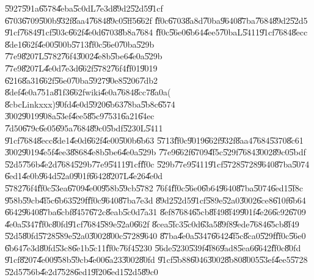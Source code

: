 \begin{case}
\U{5927}\U{591a}\U{6578}\U{4eba}\U{5c0d}L\U{7e3d}\U{89d2}\U{52d5}\U{91cf}%
\U{6703}\U{6709}\U{500b}\U{932f}\U{8aa4}\U{7684}\U{89c0}\U{5ff5}\U{662f}%
\U{ff0c}\U{6703}\U{8a8d}\U{70ba}\U{9640}\U{87ba}\U{7684}\U{89d2}\U{52d5}%
\U{91cf}\U{7684}\U{91cf}\U{503c}\U{662f}\U{4e0d}\U{6703}\U{8b8a}\U{7684}%
\U{ff0c}\U{56e0}\U{6b64}\U{4ee5}\U{70ba}L\U{5411}\U{91cf}\U{7684}\U{8ecc}%
\U{8de1}\U{662f}\U{4e00}\U{500b}\U{5713}\U{ff0c}\U{56e0}\U{70ba}\U{529b}%
\U{77e9}\U{8207}L\U{5782}\U{76f4}\U{3002}\U{4e8b}\U{5be6}\U{4e0a}\U{529b}%
\U{77e9}\U{8207}L\U{4e0d}\U{7e3d}\U{662f}\U{5782}\U{76f4}\U{ff01}\U{9019}%
\U{6216}\U{8a31}\U{662f}\U{56e0}\U{70ba}\U{5927}\U{90e8}\U{5206}\U{7db2}%
\U{8def}\U{4e0a}\U{751a}\U{81f3}\U{662f}wiki\U{4e0a}\U{7684}\U{8cc7}\U{8a0a}(%
\U{8cbc}Linkxxx)\U{90fd}\U{4e0d}\U{5920}\U{6b63}\U{78ba}\U{5b8c}\U{6574}%
\U{3002}\U{9019}\U{908a}\U{53ef}\U{4ee5}\U{85c9}\U{7531}\U{6a21}\U{64ec}%
\U{7d50}\U{679c}\U{6e05}\U{695a}\U{7684}\U{89c0}\U{5bdf}\U{5230}L\U{5411}%
\U{91cf}\U{7684}\U{8ecc}\U{8de1}\U{4e0d}\U{662f}\U{4e00}\U{500b}\U{6b63}%
\U{5713}\U{ff0c}\U{9019}\U{662f}\U{932f}\U{8aa4}\U{7684}\U{5370}\U{8c61}%
\U{3002}\U{9019}\U{4e5f}\U{4ee3}\U{8868}\U{4e8b}\U{5be6}\U{4e0a}\U{529b}%
\U{77e9}\U{662f}\U{6709}\U{4f5c}\U{529f}\U{7684}\U{3002}\U{89c0}\U{5bdf}%
\U{52d5}\U{756b}\U{4e2d}\U{7684}\U{529b}\U{77e9}\U{5411}\U{91cf}\U{ff0c}%
\U{529b}\U{77e9}\U{5411}\U{91cf}\U{5728}\U{5728}\U{9640}\U{87ba}\U{5074}%
\U{6ed1}\U{4e0b}\U{964d}\U{52a0}\U{901f}\U{6642}\U{8207}L\U{4e26}\U{4e0d}%
\U{5782}\U{76f4}\U{ff0c}\U{53ea}\U{6709}\U{4e00}\U{958b}\U{59cb}\U{5782}%
\U{76f4}\U{ff0c}\U{56e0}\U{6b64}\U{9640}\U{87ba}\U{5074}\U{6ed1}\U{5f8c}%
\U{958b}\U{59cb}\U{4f5c}\U{6b63}\U{529f}\U{ff0c}\U{9640}\U{87ba}\U{7e3d}%
\U{89d2}\U{52d5}\U{91cf}\U{589e}\U{52a0}\U{3002}\U{6ce8}\U{610f}\U{6b64}%
\U{6642}\U{9640}\U{87ba}\U{6cbf}\U{8457}\U{672c}\U{8eab}\U{5c0d}\U{7a31}%
\U{8ef8}\U{7684}\U{65cb}\U{8f49}\U{8f49}\U{901f}\U{4e26}\U{6c92}\U{6709}%
\U{4e0a}\U{5347}\U{ff0c}\U{80fd}\U{91cf}\U{7684}\U{589e}\U{52a0}\U{662f}%
\U{8cea}\U{5fc3}\U{5c0d}\U{63a5}\U{89f8}\U{9ede}\U{7684}\U{65cb}\U{8f49}%
\U{52d5}\U{80fd}\U{5728}\U{589e}\U{52a0}\U{3002}\U{800c}\U{5728}\U{9640}%
\U{87ba}\U{4e0a}\U{5347}\U{6642}\U{4f5c}\U{8ca0}\U{529f}\U{ff0c}\U{56e0}%
\U{6b64}\U{7e3d}\U{80fd}\U{53c8}\U{6e1b}\U{5c11}\U{ff0c}\U{76f4}\U{5230}%
\U{56de}\U{5230}\U{539f}\U{4f86}\U{9ad8}\U{5ea6}\U{6642}\U{ff0c}\U{80fd}%
\U{91cf}\U{8207}\U{4e00}\U{958b}\U{59cb}\U{4e00}\U{6a23}\U{3002}\U{80fd}%
\U{91cf}\U{5b88}\U{6046}\U{3002}\U{8b80}\U{8005}\U{53ef}\U{4ee5}\U{5728}%
\U{52d5}\U{756b}\U{4e2d}\U{7528}\U{6ed1}\U{9f20}\U{6ed1}\U{52d5}\U{89c0}%

\end{case}
